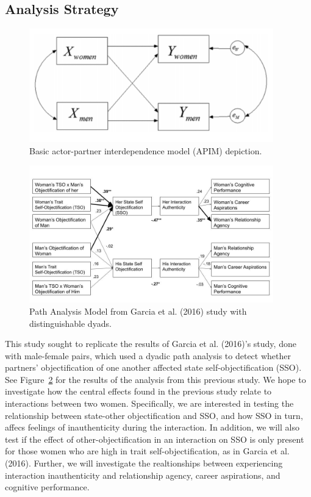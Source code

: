 \documentclass[man]{apa6}
\begin{document}
\subsection{Analysis Strategy}\label{analysis-strategy}

\begin{figure}
\includegraphics[width=400px]{APIM_figure} \caption{Basic actor-partner interdependence model (APIM) depiction.}\label{fig:apim}
\end{figure}

\begin{figure}
\includegraphics[width=400px]{2016_figure} \caption{Path Analysis Model from Garcia et al. (2016) study with distinguishable dyads.}\label{fig:2016figure}
\end{figure}

This study sought to replicate the results of Garcia et al. (2016)'s
study, done with male-female pairs, which used a dyadic path analysis to
detect whether partners' objectification of one another affected state
self-objectification (SSO). See Figure~\ref{fig:2016figure} for the
results of the analysis from this previous study. We hope to investigate
how the central effects found in the previous study relate to
interactions between two women. Specifically, we are interested in
testing the relationship between state-other objectification and SSO,
and how SSO in turn, affecs feelings of inauthenticity during the
interaction. In addition, we will also test if the effect of
other-objectification in an interaction on SSO is only present for those
women who are high in trait self-objectification, as in Garcia et al.
(2016). Further, we will investigate the realtionships between
experiencing interaction inauthenticity and relationship agency, career
aspirations, and cognitive performance.
\end{document}
